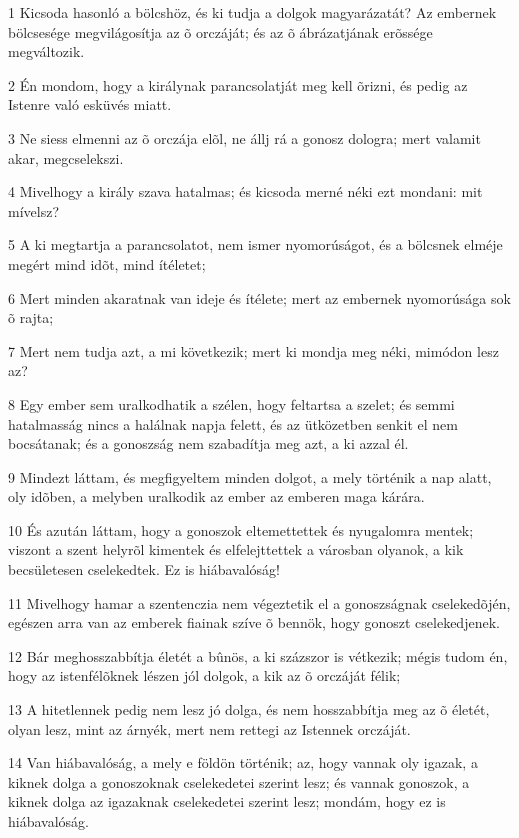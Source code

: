 \par 1 Kicsoda hasonló a bölcshöz, és ki tudja a dolgok magyarázatát? Az embernek bölcsesége megvilágosítja az õ orczáját; és az õ ábrázatjának erõssége megváltozik.
\par 2 Én mondom, hogy a királynak parancsolatját meg kell õrizni, és pedig az Istenre való esküvés miatt.
\par 3 Ne siess elmenni az õ orczája elõl, ne állj rá a gonosz dologra; mert valamit akar, megcselekszi.
\par 4 Mivelhogy a király szava hatalmas; és kicsoda merné néki ezt mondani: mit mívelsz?
\par 5 A ki megtartja a parancsolatot, nem ismer nyomorúságot, és a bölcsnek elméje megért mind idõt, mind ítéletet;
\par 6 Mert minden akaratnak van ideje és ítélete; mert az embernek nyomorúsága sok õ rajta;
\par 7 Mert nem tudja azt, a mi következik; mert ki mondja meg néki, mimódon lesz az?
\par 8 Egy ember sem uralkodhatik a szélen, hogy feltartsa a szelet; és semmi hatalmasság nincs a halálnak napja felett, és az ütközetben senkit el nem bocsátanak; és a gonoszság nem szabadítja meg azt, a ki azzal él.
\par 9 Mindezt láttam, és megfigyeltem minden dolgot, a mely történik a nap alatt, oly idõben, a melyben uralkodik az ember az emberen maga kárára.
\par 10 És azután láttam, hogy a gonoszok eltemettettek és nyugalomra mentek; viszont a szent helyrõl kimentek és elfelejttettek a városban olyanok, a kik becsületesen cselekedtek. Ez is hiábavalóság!
\par 11 Mivelhogy hamar a szentenczia nem végeztetik el a gonoszságnak cselekedõjén, egészen arra van az emberek fiainak szíve õ bennök, hogy gonoszt cselekedjenek.
\par 12 Bár meghosszabbítja életét a bûnös, a ki százszor is vétkezik; mégis tudom én, hogy az istenfélõknek lészen jól dolgok, a kik az õ orczáját félik;
\par 13 A hitetlennek pedig nem lesz jó dolga, és nem hosszabbítja meg az õ életét, olyan lesz, mint az árnyék, mert nem rettegi az Istennek orczáját.
\par 14 Van hiábavalóság, a mely e földön történik; az, hogy vannak oly igazak, a kiknek dolga a gonoszoknak cselekedetei szerint lesz; és vannak gonoszok, a kiknek dolga az igazaknak cselekedetei szerint lesz; mondám, hogy ez is hiábavalóság.
